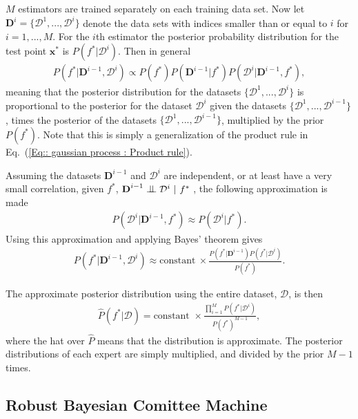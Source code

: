 \documentclass[twoside,english]{uiofysmaster}
\newcommand{\bigCI}{\mathrel{\text{\scalebox{1.07}{$\perp\mkern-10mu\perp$}}}}
\begin{document}
$M$ estimators are trained separately on each training data set. Now let $\textbf{D}^{i} = \{ \mathcal{D}^1, ..., \mathcal{D}^i \}$ denote the data sets with indices smaller than or equal to $i$ for $i=1,...,M$. For the $i$th estimator the posterior probability distribution for the test point $\textbf{x}^*$ is $P(f^* | \mathcal{D}^{i})$. Then in general
\begin{align}
P(f^* |  \textbf{D}^{i-1}, \mathcal{D}^i) \propto P(f^*) P(\textbf{D}^{i-1} | f^*) P (\mathcal{D}^i | \textbf{D}^{i-1}, f^*),
\end{align}
meaning that the posterior distribution for the datasets $\{ \mathcal{D}^1,..., \mathcal{D}^i \}$ is proportional to the posterior for the dataset $\mathcal{D}^i$ given the datasets $\{\mathcal{D}^1,..., \mathcal{D}^{i-1} \}$, times the posterior of the datasets $\{ \mathcal{D}^1,..., \mathcal{D}^{i-1}\}$, multiplied by the prior $P(f^*)$. Note that this is simply a generalization of the product rule in Eq.~(\ref{Eq:: gaussian process : Product rule}).

Assuming the datasets $\textbf{D}^{i-1}$ and $\mathcal{D}^i$ are independent, or at least have a very small correlation, given $f^*$, $\textbf{D}^{i-1} \bigCI \mathcal{D}^i ~|~ f^*$ , the following approximation is made
\begin{align}\label{Eq:: evaluating cross : BCM assumption}
P(\mathcal{D}^i | \textbf{D}^{i-1},f^*) \approx P(\mathcal{D}^i | f^*).
\end{align}
Using this approximation and applying Bayes' theorem gives
\begin{align}
P(f^* | \textbf{D}^{i-1}, \mathcal{D}^i) \approx \text{constant}~ \times \frac{P(f^*|\textbf{D}^{i-1}) P(f^* | \mathcal{D}^i)}{P(f^*)}. 
\end{align}

The approximate posterior distribution using the entire dataset, $\mathcal{D}$, is then 
\begin{align}
\hat{P}(f^* | \mathcal{D}) = \text{constant } \times \frac{\prod_{i=1}^M P(f^*| \mathcal{D}^i)}{P(f^*)^{M-1}} ,
\end{align}
where the hat over $\hat{P}$ means that the distribution is approximate. The posterior distributions of each expert are simply multiplied, and divided by the prior $M-1$ times.

\subsection{Robust Bayesian Comittee Machine}
\end{document}
